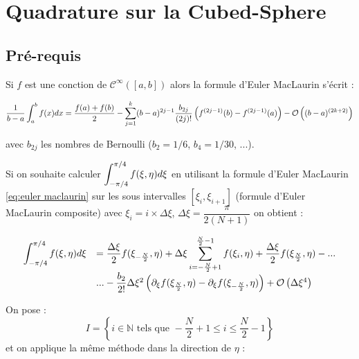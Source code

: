 \section{Quadrature sur la Cubed-Sphere}





\subsection{Pré-requis} %

Si $f$ est une conction de $\mathcal{C}^{\infty}([a,b])$ alors la formule d'Euler MacLaurin s'écrit :

\begin{equation}
\dfrac{1}{b-a} \displaystyle\int_a^b f(x)dx = \dfrac{f(a)+f(b)}{2} - \displaystyle\sum\limits_{j=1}^k (b-a)^{2j-1} \dfrac{b_{2j}}{(2j)!} \left( f^{(2j-1)}(b) - f^{(2j-1)}(a) \right) - \mathcal{O}\left( (b-a)^{(2k+2)} \right)
\label{eq:euler maclaurin}
\end{equation}

avec $b_{2j}$ les nombres de Bernoulli ($b_2=1/6$, $b_4=1/30$, ...).

Si on souhaite calculer $\displaystyle\int_{-\pi/4}^{\pi/4} f(\xi,\eta)d\xi$ en utilisant la formule d'Euler MacLaurin \eqref{eq:euler maclaurin} sur les sous intervalles $[\xi_i, \xi_{i+1}]$ (formule d'Euler MacLaurin composite) avec $\xi_i= i \times \Delta \xi$, $\Delta \xi = \dfrac{\pi}{2(N+1)}$ on obtient :

\begin{equation}
\begin{array}{rl}
\displaystyle\int_{-\pi/4}^{\pi/4} f(\xi,\eta)d\xi & = \dfrac{\Delta \xi}{2} f(\xi_{-\frac{N}{2}},\eta) +  \Delta \xi \displaystyle\sum\limits_{i=-\frac{N}{2}+1}^{\frac{N}{2}-1} f(\xi_i,\eta) + \frac{\Delta \xi}{2} f(\xi_{\frac{N}{2}},\eta)- ...\\
                                       & ... - \dfrac{b_2}{2!} \Delta \xi^2 \left( \partial_\xi f(\xi_{\frac{N}{2}},\eta) - \partial_\xi f(\xi_{-\frac{N}{2}},\eta) \right) + \mathcal{O} \left( \Delta \xi ^4 \right)
\end{array}
\end{equation}

On pose : $$I = \left\lbrace i\in\mathbb{N} \text{ tels que } -\frac{N}{2}+1 \leq i \leq \frac{N}{2}-1 \right\rbrace$$ et on applique la même méthode dans la direction de $\eta$  :

